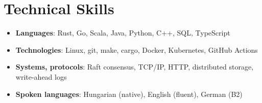 \documentclass[letterpaper,11pt]{article}
\begin{document}
\section{Technical Skills}\vspace{5pt}
\begin{itemize}[leftmargin=0.15in, label={}]
	\item{\small{
	      \textbf{Languages}: {Rust, Go, Scala, Java, Python, C++, SQL, TypeScript} \\
	      }}\vspace{-0pt}
	      
	\item{\small{
	      \textbf{Technologies}: {Linux, git, make, cargo, Docker, Kubernetes, GitHub Actions} \\
	      }}\vspace{-0pt}
	      
	\item{\small{
	      \textbf{Systems, protocols}: {Raft consensus, TCP/IP, HTTP, distributed storage, write-ahead logs} \\ }}\vspace{-0pt}
	      
	\item{\small{
	      \textbf{Spoken languages}: {Hungarian (native), English (fluent), German (B2)} \\
	      }}\vspace{-0pt}
	      
\end{itemize}


\end{document}
